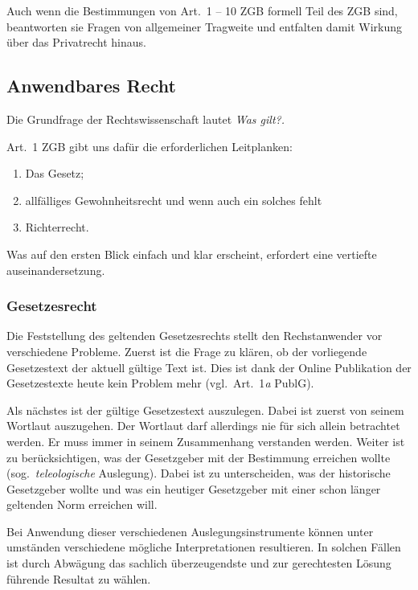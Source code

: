 Auch wenn die Bestimmungen von Art.\ 1 -- 10 ZGB formell Teil des ZGB
sind, beantworten sie Fragen von allgemeiner Tragweite\autocite[Seite
31]{tuor_schnyder} und entfalten damit Wirkung über das Privatrecht
hinaus\autocite[\S\ 3]{riemer_einleitungsartikel}.

\subsection{Anwendbares Recht}
Die Grundfrage der Rechtswissenschaft lautet \itshape \flqq Was
gilt?\frqq\normalfont.

Art.\ 1 ZGB gibt uns dafür die erforderlichen Leitplanken:

\begin{enumerate}
    \item Das Gesetz;
    \item allfälliges Gewohnheitsrecht und wenn auch ein solches fehlt
    \item Richterrecht\autocite[\S\ 4 N.\ 2]{riemer_einleitungsartikel}.
\end{enumerate}

Was auf den ersten Blick einfach und klar erscheint, erfordert eine
vertiefte auseinandersetzung.

\subsubsection{Gesetzesrecht}
Die Feststellung des geltenden Gesetzesrechts stellt den Rechstanwender
vor verschiedene Probleme. Zuerst ist die Frage zu klären, ob der
vorliegende Gesetzestext der aktuell gültige Text ist. Dies ist dank der
Online Publikation der Gesetzestexte heute kein Problem mehr (vgl.\
Art.\ 1\textit{a} PublG). 

Als nächstes ist der gültige Gesetzestext
auszulegen. Dabei ist zuerst von seinem Wortlaut auszugehen. Der
Wortlaut darf allerdings nie für sich allein betrachtet werden. Er muss
immer in seinem Zusammenhang verstanden werden\autocite[\S\ 4 N.\
35]{riemer_einleitungsartikel}. Weiter ist zu berücksichtigen, was der
Gesetzgeber mit der Bestimmung erreichen wollte (sog.\
\textit{teleologische} Auslegung). Dabei ist zu unterscheiden, was der
historische Gesetzgeber wollte und was ein heutiger Gesetzgeber mit
einer schon länger geltenden Norm erreichen will.

Bei Anwendung dieser verschiedenen Auslegungsinstrumente können unter
umständen verschiedene mögliche Interpretationen resultieren. In solchen
Fällen ist durch Abwägung das sachlich überzeugendste und zur
gerechtesten Lösung führende Resultat zu wählen\autocite[\S\ 4 N.\
59]{riemer_einleitungsartikel}.
